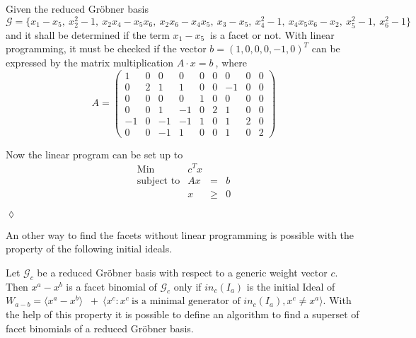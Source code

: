 \begin{env_example}\normalfont

Given the reduced Gröbner basis \\
 $\mathcal{G} = \{x_1 - x_5,~x_{2}^{2}-1,~x_{2}x_{4}-x_{5}x_{6},~x_{2}x_{6}-x_{4}x_{5},~x_{3}-x_{5},~x_{4}^{2}-1,~x_{4}x_{5}x_{6}-x_{2},~x_{5}^{2}-1,~x_{6}^{2}-1  \}~$ and it shall be determined if the term $x_1-x_5~$ is a facet or not.
 With linear programming, it must be checked if the vector $b = {\left(1,0,0,0,-1,0\right)}^{T}$ can be expressed by the matrix multiplication $A \cdot x = b~$, where \\
 \[
 A =
 \begin{pmatrix}
 1  & 0 & 0  & 0  & 0 & 0 & 0  & 0 & 0\\ 
 0  & 2 & 1  & 1  & 0 & 0 & -1 & 0 & 0\\  
 0  & 0 & 0  & 0  & 1 & 0 & 0  & 0 & 0\\ 
 0  & 0 & 1  & -1 & 0 & 2 & 1  & 0 & 0\\
 -1 & 0 & -1 & -1 & 1 & 0 & 1  & 2 & 0\\
 0  & 0 & -1 & 1  & 0 & 0 & 1  & 0 & 2
 \end{pmatrix} 
 \] 
  
 Now the linear program can be set up to 
 \[
 	\begin{array}{lrcl}
 	\textrm{Min}   & c^T x &      &   \\
 	\textrm{subject to} & Ax    & =    & b \\
 			    & x     & \geq & 0
 	\end{array}
 \]
 

\begin{flushright}
$\lozenge$
\end{flushright}
\end{env_example}
\newpage 
An other way to find the facets without linear programming is possible with the property of the following initial ideals.

Let $\mathcal{G}_{c} $ be a reduced Gröbner basis with respect to a generic weight vector $c$. Then $x^{a} - x^{b}$ is a facet binomial of $\mathcal{G}_{c}$ only if $in_{c}(I_{a}) $ is the initial Ideal of $W_{a - b} = \langle x^{a}-x^{b}\rangle$
$~+~ \langle x^{c}  : x^{c}~\textrm{is a minimal generator of~} in_{c}(I_{a}), x^{c} \neq x^{a} \rangle$.\cite{tigers}
With the help of this property it is possible to define an algorithm to find a superset of facet binomials of a reduced Gröbner basis.

